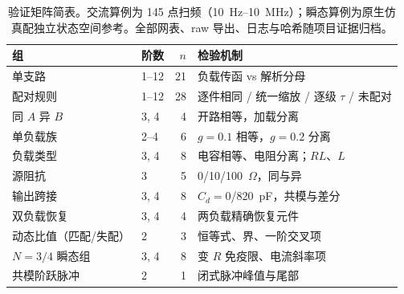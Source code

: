 



\FloatBarrier


\begin{table}[htbp]
\centering
\caption{验证矩阵简表。交流算例为 145 点扫频（10~Hz--10~MHz）；瞬态算例为原生仿真配独立状态空间参考。全部网表、raw 导出、日志与哈希随项目证据归档。}
\label{tab:case-matrix}
\begin{tabular}{llrl}
\toprule
组 & 阶数 & $n$ & 检验机制 \\
\midrule
单支路 & 1--12 & 21 & 负载传函 vs 解析分母 \\
配对规则 & 1--12 & 28 & 逐件相同 / 统一缩放 / 逐级 $\tau$ / 未配对 \\
同 $A$ 异 $B$ & 3, 4 & 4 & 开路相等，加载分离 \\
单负载族 & 2--4 & 6 & $g{=}0.1$ 相等，$g{=}0.2$ 分离 \\
负载类型 & 3, 4 & 8 & 电容相等、电阻分离；$RL$、$L$ \\
源阻抗 & 3 & 5 & 0/10/100~$\Omega$，同与异 \\
输出跨接 & 3, 4 & 8 & $C_d{=}0$/820~pF，共模与差分 \\
双负载恢复 & 3, 4 & 4 & 两负载精确恢复元件 \\
\midrule
动态比值（匹配/失配） & 2 & 3 & 恒等式、界、一阶交叉项 \\
$N{=}3/4$ 瞬态组 & 3, 4 & 8 & 变 $R$ 免疫限、电流斜率项 \\
共模阶跃脉冲 & 2 & 1 & 闭式脉冲峰值与尾部 \\
\bottomrule
\end{tabular}
\end{table}
